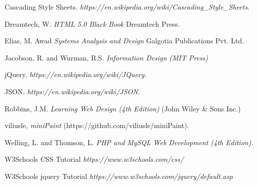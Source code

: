 \documentclass[12pt,a4 paper]{report}
\begin{document}
\begin{thebibliography}{widestlabel}


 Cascading Style Sheets. \emph{https://en.wikipedia.org/wiki/Cascading\_Style\_Sheets}\hspace{.07cm}.

 Dreamtech, W.  \emph{HTML 5.0 Black Book} Dreamtech Press.

 Elias, M. Awad \emph{Systems Analysis and Design} Galgotia Publications Pvt. Ltd.

 Jacobson, R. and Wurman, R.S.  \emph{Information Design (MIT Press)}

 jQuery. \emph{https://en.wikipedia.org/wiki/JQuery}\hspace{.07cm}.

 JSON. \emph{https://en.wikipedia.org/wiki/JSON}\hspace{.07cm}.

 Robbins, J.M. \emph{Learning Web Design (4th Edition)} (John Wiley \& Sons Inc.)

 viliusle, \emph{miniPaint} (https://github.com/viliusle/miniPaint).

 Welling, L. and Thomson, L.  \emph{PHP and MySQL Web Development (4th Edition).}

 W3Schools CSS Tutorial \emph{https://www.w3schools.com/css/}

 W3Schools jquery Tutorial \emph{https://www.w3schools.com/jquery/default.asp}


\end{thebibliography}
\end{document}
